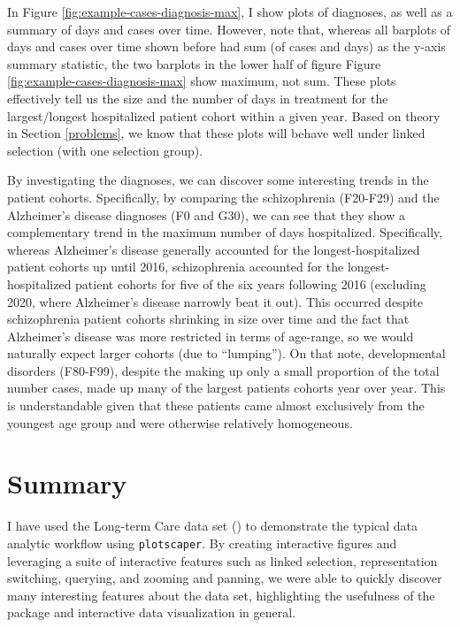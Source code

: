 \documentclass[
  openany]{book}
\theoremstyle{definition}
\theoremstyle{definition}
\theoremstyle{definition}
\theoremstyle{definition}
\theoremstyle{remark}
\begin{document}
In Figure \ref{fig:example-cases-diagnosis-max}, I show plots of diagnoses, as well as a summary of days and cases over time. However, note that, whereas all barplots of days and cases over time shown before had sum (of cases and days) as the y-axis summary statistic, the two barplots in the lower half of figure Figure \ref{fig:example-cases-diagnosis-max} show maximum, not sum. These plots effectively tell us the size and the number of days in treatment for the largest/longest hospitalized patient cohort within a given year. Based on theory in Section \ref{problems}, we know that these plots will behave well under linked selection (with one selection group).

By investigating the diagnoses, we can discover some interesting trends in the patient cohorts. Specifically, by comparing the schizophrenia (F20-F29) and the Alzheimer's disease diagnoses (F0 and G30), we can see that they show a complementary trend in the maximum number of days hospitalized. Specifically, whereas Alzheimer's disease generally accounted for the longest-hospitalized patient cohorts up until 2016, schizophrenia accounted for the longest-hospitalized patient cohorts for five of the six years following 2016 (excluding 2020, where Alzheimer's disease narrowly beat it out). This occurred despite schizophrenia patient cohorts shrinking in size over time and the fact that Alzheimer's disease was more restricted in terms of age-range, so we would naturally expect larger cohorts (due to ``lumping''). On that note, developmental disorders (F80-F99), despite the making up only a small proportion of the total number cases, made up many of the largest patients cohorts year over year. This is understandable given that these patients came almost exclusively from the youngest age group and were otherwise relatively homogeneous.

\section{Summary}\label{summary-3}

I have used the Long-term Care data set () to demonstrate the typical data analytic workflow using \texttt{plotscaper}. By creating interactive figures and leveraging a suite of interactive features such as linked selection, representation switching, querying, and zooming and panning, we were able to quickly discover many interesting features about the data set, highlighting the usefulness of the package and interactive data visualization in general.
\end{document}
